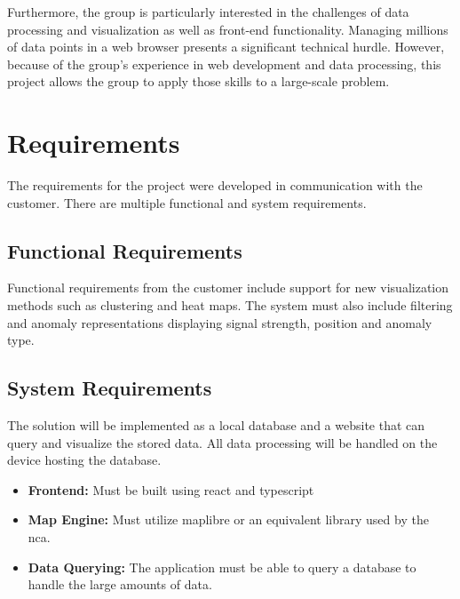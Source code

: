 Furthermore, the group is particularly interested in the challenges of data processing and visualization as well as front-end functionality. Managing millions of data points in a web browser presents a significant technical hurdle. However, because of the group's experience in web development and data processing, this project allows the group to apply those skills to a large-scale problem.

\section{Requirements}

The requirements for the project were developed in communication with the customer. There are multiple functional and system requirements. 



\subsection{Functional Requirements}

Functional requirements from the customer include support for new visualization methods such as clustering and heat maps. The system must also include filtering and anomaly representations displaying signal strength, position and anomaly type. 


\subsection{System Requirements}

The solution will be implemented as a local database and a website that can query and visualize the stored data. All data processing will be handled on the device hosting the database. 
\begin{itemize}
\item \textbf{Frontend:} Must be built using \gls{react} and \gls{typescript}
\item \textbf{Map Engine:} Must utilize \gls{maplibre} or an equivalent library used by the \acrshort{nca}.
\item \textbf{Data Querying:} The application must be able to query a database to handle the large amounts of data.
\end{itemize}
